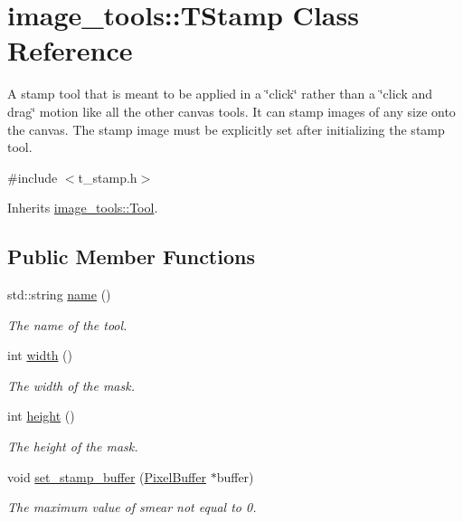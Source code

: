 \hypertarget{classimage__tools_1_1TStamp}{}\section{image\+\_\+tools\+:\+:T\+Stamp Class Reference}
\label{classimage__tools_1_1TStamp}


A stamp tool that is meant to be applied in a \char`\"{}click\char`\"{} rather than a \char`\"{}click and drag\char`\"{} motion like all the other canvas tools. It can stamp images of any size onto the canvas. The stamp image must be explicitly set after initializing the stamp tool.  




{\ttfamily \#include $<$t\+\_\+stamp.\+h$>$}



Inherits \hyperlink{classimage__tools_1_1Tool}{image\+\_\+tools\+::\+Tool}.

\subsection*{Public Member Functions}
\begin{DoxyCompactItemize}
\item 
std\+::string \hyperlink{classimage__tools_1_1TStamp_a1a1dec7161830a68bdaefbc0ec567855}{name} ()
\begin{DoxyCompactList}\small\item\em The name of the tool. \end{DoxyCompactList}\item 
int \hyperlink{classimage__tools_1_1TStamp_a8ca8765351ee8e42bd576cb360a51335}{width} ()
\begin{DoxyCompactList}\small\item\em The width of the mask. \end{DoxyCompactList}\item 
int \hyperlink{classimage__tools_1_1TStamp_a553c39533c9fda20f0a1dcd2d4947ada}{height} ()
\begin{DoxyCompactList}\small\item\em The height of the mask. \end{DoxyCompactList}\item 
void \hyperlink{classimage__tools_1_1TStamp_a8c75d539609e224340895bf7e28a246b}{set\+\_\+stamp\+\_\+buffer} (\hyperlink{classimage__tools_1_1PixelBuffer}{Pixel\+Buffer} $\ast$buffer)
\begin{DoxyCompactList}\small\item\em The maximum value of smear not equal to 0. \end{DoxyCompactList}\end{DoxyCompactItemize}
